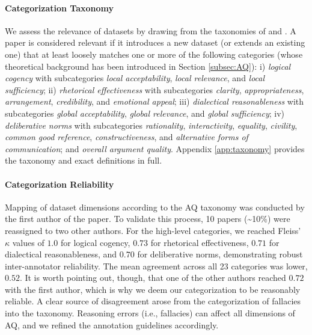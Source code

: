 \paragraph{Categorization Taxonomy}
We assess the relevance of datasets by drawing from the taxonomies of \citet{wachsmuth-etal-2017-computational} and \citet{friess2015deliberation}. A paper is considered relevant if it introduces a new dataset (or extends an existing one) that at least loosely matches one or more of the following categories (whose theoretical background has been introduced in Section \ref{subsec:AQ}): i) \textit{logical cogency} with subcategories \textit{local acceptability}, \textit{local relevance}, and \textit{local sufficiency}; ii) \textit{rhetorical effectiveness} with subcategories \textit{clarity}, \textit{appropriateness}, \textit{arrangement}, \textit{credibility}, and \textit{emotional appeal}; iii) \textit{dialectical reasonableness} with subcategories \textit{global acceptability}, \textit{global relevance}, and \textit{global sufficiency}; iv) \textit{deliberative norms} with subcategories \textit{rationality}, \textit{interactivity}, \textit{equality}, \textit{civility}, \textit{common good reference}, \textit{constructiveness}, and \textit{alternative forms of communication}; and \textit{overall argument quality}. Appendix \ref{app:taxonomy} provides the taxonomy and exact definitions in full.

\paragraph{Categorization Reliability}
Mapping of dataset dimensions according to the AQ taxonomy was conducted by the first author of the paper. To validate this process, 10 papers (\textasciitilde 10\%) were reassigned to two other authors. For the high-level categories, we reached Fleiss' $\kappa$ values of $1.0$ for logical cogency, $0.73$ for rhetorical effectiveness, $0.71$ for dialectical reasonableness, and $0.70$ for deliberative norms, demonstrating robust inter-annotator reliability. The mean agreement across all 23 categories was lower, $0.52$. It is worth pointing out, though, that one of the other authors reached $0.72$ with the first author, which is why we deem our categorization to be reasonably reliable. A clear source of disagreement arose from the categorization of fallacies into the taxonomy. Reasoning errors (i.e., fallacies) can affect all dimensions of AQ, and we refined the annotation guidelines accordingly.

